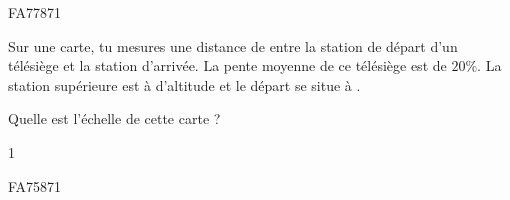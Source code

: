 \documentclass[a4paper,11pt]{report}
\begin{document}
\begin{exol}{FA77}{87}{1} %
\end{exol}



\begin{exo}{
Sur une carte, tu mesures une distance de  entre la station de départ d'un télésiège et la station d'arrivée. La pente moyenne de ce télésiège est de $20\%$.
La station supérieure est à  d'altitude et le départ se situe à .

Quelle est l'échelle de cette carte ?
}{1}
\end{exo}


\begin{exol}{FA75}{87}{1}
\end{exol}
\end{document}
